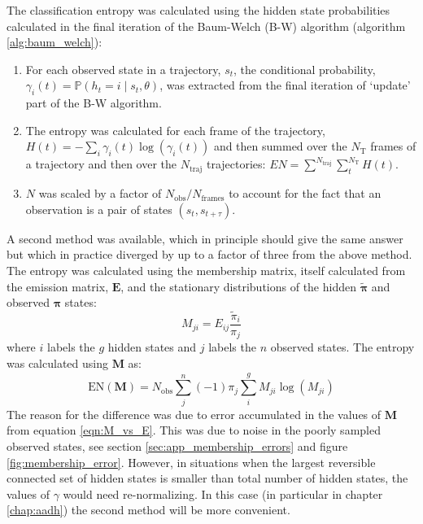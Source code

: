 The classification entropy was calculated using the hidden state probabilities calculated in the final iteration of the Baum-Welch (B-W) algorithm (algorithm \ref{alg:baum_welch}): 
\begin{enumerate}
    \item For each observed state in a trajectory, $s_t$, the conditional probability, $\gamma_{i}(t)=\mathbb{P}\left(h_{t}=i \mid s_t, \theta\right)$, was extracted from the final iteration of `update' part of the B-W algorithm. 
    \item The entropy was calculated for each frame of the trajectory,  $H(t)=-\sum_{i}\gamma_{i}(t)\log{\left(\gamma_{i}(t)\right)}$ and then summed over the $N_{\mathrm{T}}$ frames of a trajectory and then over the $N_{\mathrm{traj}}$ trajectories: $EN = \sum^{N_{\mathrm{traj}}} \sum_{t}^{N_{\mathrm{T}}} H(t)$.
    \item $N$ was scaled by a factor of $N_{\mathrm{obs}}/N_{\mathrm{frames}}$ to account for the fact that an observation is a pair of states $(s_{t}, s_{t+\tau})$.
\end{enumerate}
A second method was available, which in principle should give the same answer but which in practice diverged by up to a factor of three from the above method. The entropy was calculated using the membership matrix, itself calculated from the emission matrix, $\mathbf{E}$, and the stationary distributions of the hidden $\widetilde{\bm{\pi}}$ and observed $\bm{\pi}$ states: 
\begin{equation}\label{eqn:M_vs_E}
    M_{ji} = E_{ij}\frac{\widetilde{\pi}_{i}}{\pi_{j}}
\end{equation}
where $i$ labels the $g$ hidden states and $j$ labels the $n$ observed states. The entropy was calculated using $\mathbf{M}$ as: 
\begin{equation}\label{eqn:ent_v2}
    \mathrm{EN}(\mathbf{M}) = N_{\mathrm{obs}}\sum^{n}_{j}(-1)\pi_{j}\sum^{g}_{i} M_{ji}\log{\left(M_{ji}\right)}
\end{equation}
The reason for the difference was due to error accumulated in the values of  $\mathbf{M}$ from equation \ref{eqn:M_vs_E}. This was due to noise in the poorly sampled observed states, see section \ref{sec:app_membership_errors} and figure \ref{fig:membership_error}. However, in situations when the largest reversible connected set of hidden states is smaller than total number of hidden states, the values of $\gamma$ would need re-normalizing. In this case (in particular in chapter \ref{chap:aadh}) the second method will be more convenient. 

